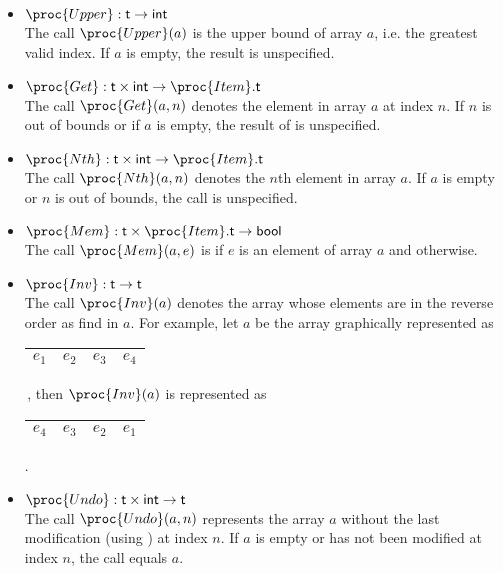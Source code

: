 \documentclass[11pt,a4paper]{article}
\newcommand\type[1]{\textsf{#1}}
\begin{document}
\begin{itemize}
\begin{itemize}
    \item \(\proc{Upper} : \type{t} \rightarrow \type{int}\)\\
    The call \(\proc{Upper} (a)\) is the upper bound of array
    \(a\), i.e. the greatest valid index. If \(a\) is empty, the
    result is unspecified.

    \item \(\proc{Get} : \type{t} \times \type{int} \rightarrow
    \proc{Item}.\type{t}\)\\
    The call \(\proc{Get} (a, n)\) denotes the element in
    array \(a\) at index \(n\). If \(n\) is out of bounds or if
    \(a\) is empty, the result of  is unspecified.

    \item \(\proc{Nth} : \type{t} \times \type{int} \rightarrow
      \proc{Item}.\type{t}\)\\ The call \(\proc{Nth}(a,n)\) denotes
      the \(n\)th element in array \(a\). If \(a\) is empty or \(n\)
      is out of bounds, the call is unspecified.

    \item \(\proc{Mem} : \type{t} \times \proc{Item}.\type{t} 
    \rightarrow \type{bool}\)\\
    The call \(\proc{Mem}(a,e)\) is  if \(e\) is an element
    of array \(a\) and  otherwise.    

    \item \(\proc{Inv} : \type{t} \rightarrow \type{t}\)\\ 
    The call \(\proc{Inv} (a)\) denotes the array whose elements are
    in the reverse order as find in \(a\). For example, let \(a\) be
    the array graphically represented as
    \begin{tabular}{|c|c|c|c|}\hline\(e_1\) & \(e_2\) & 
    \(e_3\) & \(e_4\)\\\hline\end{tabular}\,, then \(\proc{Inv}(a)\) is
    represented as \begin{tabular}{|c|c|c|c|}\hline\(e_4\) & \(e_3\)
    & \(e_2\) & \(e_1\)\\\hline\end{tabular}.

    \item \(\proc{Undo} : \type{t} \times \type{int} \rightarrow
    \type{t}\)\\
    The call \(\proc{Undo}(a,n)\) represents the array \(a\) without
    the last modification (using ) at index \(n\). If \(a\)
    is empty or has not been modified at index \(n\), the call equals
    \(a\).

  \end{itemize}

\end{itemize}


\end{document}
